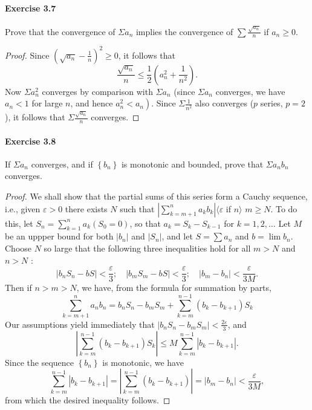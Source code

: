 \documentclass{article}
\theoremstyle{definition}
\begin{document}
\paragraph{Exercise 3.7} Prove that the convergence of $\Sigma a_{n}$ implies the convergence of $\sum \frac{\sqrt{a_{n}}}{n}$ if $a_n\geq 0$.
\begin{proof}
    Since $\left(\sqrt{a_n}-\frac{1}{n}\right)^2 \geq 0$, it follows that
$$
\frac{\sqrt{a_n}}{n} \leq \frac{1}{2}\left(a_n^2+\frac{1}{n^2}\right) .
$$
Now $\Sigma a_n^2$ converges by comparison with $\Sigma a_n$ (since $\Sigma a_n$ converges, we have $a_n<1$ for large $n$, and hence $\left.a_n^2<a_n\right)$. Since $\Sigma \frac{1}{n^2}$ also converges ($p$ series, $p=2$ ), it follows that $\Sigma \frac{\sqrt{a_n}}{n}$ converges.
\end{proof}


\paragraph{Exercise 3.8} If $\Sigma a_{n}$ converges, and if $\left\{b_{n}\right\}$ is monotonic and bounded, prove that $\Sigma a_{n} b_{n}$ converges.
\begin{proof}
    We shall show that the partial sums of this series form a Cauchy sequence, i.e., given $\varepsilon>0$ there exists $N$ such that $\left|\sum_{k=m+1}^n a_k b_k\right|\langle\varepsilon$ if $n\rangle$ $m \geq N$. To do this, let $S_n=\sum_{k=1}^n a_k\left(S_0=0\right)$, so that $a_k=S_k-S_{k-1}$ for $k=1,2, \ldots$ Let $M$ be an uppper bound for both $\left|b_n\right|$ and $\left|S_n\right|$, and let $S=\sum a_n$ and $b=\lim b_n$. Choose $N$ so large that the following three inequalities hold for all $m>N$ and $n>N$ :
$$
\left|b_n S_n-b S\right|<\frac{\varepsilon}{3} ; \quad\left|b_m S_m-b S\right|<\frac{\varepsilon}{3} ; \quad\left|b_m-b_n\right|<\frac{\varepsilon}{3 M} .
$$
Then if $n>m>N$, we have, from the formula for summation by parts,
$$
\sum_{k=m+1}^n a_n b_n=b_n S_n-b_m S_m+\sum_{k=m}^{n-1}\left(b_k-b_{k+1}\right) S_k
$$
Our assumptions yield immediately that $\left|b_n S_n-b_m S_m\right|<\frac{2 \varepsilon}{3}$, and
$$
\left|\sum_{k=m}^{n-1}\left(b_k-b_{k+1}\right) S_k\right| \leq M \sum_{k=m}^{n-1}\left|b_k-b_{k+1}\right| .
$$
Since the sequence $\left\{b_n\right\}$ is monotonic, we have
$$
\sum_{k=m}^{n-1}\left|b_k-b_{k+1}\right|=\left|\sum_{k=m}^{n-1}\left(b_k-b_{k+1}\right)\right|=\left|b_m-b_n\right|<\frac{\varepsilon}{3 M},
$$
from which the desired inequality follows.
\end{proof}
\end{document}
